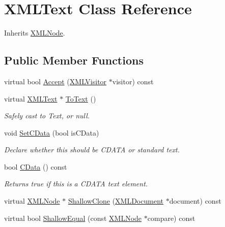 \hypertarget{classtinyxml2_1_1_x_m_l_text}{\section{X\-M\-L\-Text Class Reference}
\label{classtinyxml2_1_1_x_m_l_text}
}


Inherits \hyperlink{classtinyxml2_1_1_x_m_l_node}{X\-M\-L\-Node}.

\subsection*{Public Member Functions}
\begin{DoxyCompactItemize}
\item 
virtual bool \hyperlink{classtinyxml2_1_1_x_m_l_text_a66d46e7527ec62912b49400b27137eba}{Accept} (\hyperlink{classtinyxml2_1_1_x_m_l_visitor}{X\-M\-L\-Visitor} $\ast$visitor) const 
\item 
\hypertarget{classtinyxml2_1_1_x_m_l_text_a09e4d7c542cdf82a5be19b3b9e4b6e9e}{virtual \hyperlink{classtinyxml2_1_1_x_m_l_text}{X\-M\-L\-Text} $\ast$ \hyperlink{classtinyxml2_1_1_x_m_l_text_a09e4d7c542cdf82a5be19b3b9e4b6e9e}{To\-Text} ()}\label{classtinyxml2_1_1_x_m_l_text_a09e4d7c542cdf82a5be19b3b9e4b6e9e}

\begin{DoxyCompactList}\small\item\em Safely cast to Text, or null. \end{DoxyCompactList}\item 
\hypertarget{classtinyxml2_1_1_x_m_l_text_ad7b3178710180eb4fdc24224a1ec621a}{void \hyperlink{classtinyxml2_1_1_x_m_l_text_ad7b3178710180eb4fdc24224a1ec621a}{Set\-C\-Data} (bool is\-C\-Data)}\label{classtinyxml2_1_1_x_m_l_text_ad7b3178710180eb4fdc24224a1ec621a}

\begin{DoxyCompactList}\small\item\em Declare whether this should be C\-D\-A\-T\-A or standard text. \end{DoxyCompactList}\item 
\hypertarget{classtinyxml2_1_1_x_m_l_text_a676fd7048e33c750b84a29ec8ccd84f3}{bool \hyperlink{classtinyxml2_1_1_x_m_l_text_a676fd7048e33c750b84a29ec8ccd84f3}{C\-Data} () const }\label{classtinyxml2_1_1_x_m_l_text_a676fd7048e33c750b84a29ec8ccd84f3}

\begin{DoxyCompactList}\small\item\em Returns true if this is a C\-D\-A\-T\-A text element. \end{DoxyCompactList}\item 
virtual \hyperlink{classtinyxml2_1_1_x_m_l_node}{X\-M\-L\-Node} $\ast$ \hyperlink{classtinyxml2_1_1_x_m_l_text_a4267351368d51803f98480981d622c00}{Shallow\-Clone} (\hyperlink{classtinyxml2_1_1_x_m_l_document}{X\-M\-L\-Document} $\ast$document) const 
\item 
virtual bool \hyperlink{classtinyxml2_1_1_x_m_l_text_aa4032d1d6b59a8392a1dc6a081618bbc}{Shallow\-Equal} (const \hyperlink{classtinyxml2_1_1_x_m_l_node}{X\-M\-L\-Node} $\ast$compare) const 
\end{DoxyCompactItemize}


